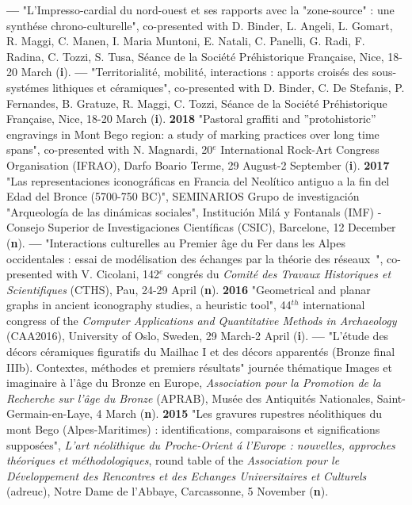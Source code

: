 \documentclass{article}
\begin{document}
\smallbreak
\textbf{--- }"L'Impresso-cardial du nord-ouest et ses rapports avec la "zone-source" : une synth\'{e}se chrono-culturelle", co-presented with D. Binder, L. Angeli, L. Gomart, R. Maggi, C. Manen, I. Maria Muntoni, E. Natali, C. Panelli, G. Radi, F. Radina, C. Tozzi, S. Tusa, S\'{e}ance de la Soci\'{e}t\'{e} Pr\'{e}historique Fran\c{c}aise, Nice, 18-20 March (\textbf{i}).
\smallbreak
\textbf{--- }"Territorialit\'{e}, mobilit\'{e}, interactions : apports crois\'{e}s des sous-syst\'{e}mes lithiques et c\'{e}ramiques", co-presented with D. Binder, C. De Stefanis, P. Fernandes, B. Gratuze, R. Maggi, C. Tozzi, S\'{e}ance de la Soci\'{e}t\'{e} Pr\'{e}historique Fran\c{c}aise, Nice, 18-20 March (\textbf{i}).
\smallbreak
\textbf{2018 }"Pastoral graffiti and ''protohistoric'' engravings in Mont Bego region: a study of marking practices over long time spans", co-presented with N. Magnardi, 20${}^{e}$ International Rock-Art Congress Organisation (IFRAO), Darfo Boario Terme, 29 August-2 September (\textbf{i}).
\smallbreak
\textbf{2017 }"Las representaciones iconogr\'{a}ficas en Francia del Neol\'{i}tico antiguo a la fin del Edad del Bronce (5700-750 BC)", SEMINARIOS Grupo de investigaci\'{o}n "Arqueolog\'{i}a de las din\'{a}micas sociales", Instituci\'{o}n Mil\'{a} y Fontanals (IMF) - Consejo Superior de Investigaciones Cient\'{i}ficas (CSIC), Barcelone, 12 December (\textbf{n}).
\smallbreak
\textbf{--- } "Interactions culturelles au Premier \^{a}ge du Fer dans les Alpes occidentales : essai de mod\'{e}lisation des \'{e}changes par la th\'{e}orie des r\'{e}seaux~", co-presented with V. Cicolani, 142${}^{e}$ congr\'{e}s du \textit{Comit\'{e} des Travaux Historiques et Scientifiques} (CTHS), Pau, 24-29 April (\textbf{n}).
\smallbreak
\textbf{2016 }"Geometrical and planar graphs in ancient iconography studies, a heuristic tool", 44${}^{th}$ international congress of the \textit{Computer Applications and Quantitative Methods in Archaeology} (CAA2016), University of Oslo, Sweden, 29 March-2 April (\textbf{i}).
\smallbreak
\textbf{--- }"L'\'{e}tude des d\'{e}cors c\'{e}ramiques figuratifs du Mailhac I et des d\'{e}cors apparent\'{e}s (Bronze final IIIb). Contextes, m\'{e}thodes et premiers r\'{e}sultats" journ\'{e}e th\'{e}matique Images et imaginaire \`{a} l'\^{a}ge du Bronze en Europe, \textit{Association pour la Promotion de la Recherche sur l'\^{a}ge du Bronze} (APRAB), Mus\'{e}e des Antiquit\'{e}s Nationales, Saint-Germain-en-Laye, 4 March (\textbf{n}).
\smallbreak
\textbf{2015 }"Les gravures rupestres n\'{e}olithiques du mont Bego (Alpes-Maritimes) : identifications, comparaisons et significations suppos\'{e}es", \textit{L'art n\'{e}olithique du Proche-Orient \'{a} l'Europe : nouvelles, approches th\'{e}oriques et m\'{e}thodologiques}, round table of the \textit{Association pour le D\'{e}veloppement des Rencontres et des Echanges Universitaires et Culturels} (adreuc), Notre Dame de l'Abbaye, Carcassonne, 5 November (\textbf{n}).
\end{document}
